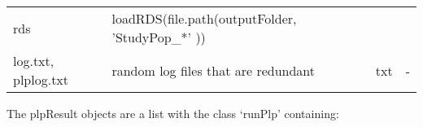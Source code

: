 \documentclass[
]{article}
\begin{document}
\begin{longtable}[]{@{}llll@{}}
\begin{minipage}[t]{0.08\columnwidth}
rds\strut
\end{minipage} & \begin{minipage}[t]{0.35\columnwidth}\raggedright
loadRDS(file.path(outputFolder, 'StudyPop\_*' ))\strut
\end{minipage}\tabularnewline
\begin{minipage}[t]{0.14\columnwidth}\raggedright
log.txt, plplog.txt\strut
\end{minipage} & \begin{minipage}[t]{0.31\columnwidth}\raggedright
random log files that are redundant\strut
\end{minipage} & \begin{minipage}[t]{0.08\columnwidth}\raggedright
txt\strut
\end{minipage} & \begin{minipage}[t]{0.35\columnwidth}\raggedright
-\strut
\end{minipage}\tabularnewline
\bottomrule
\end{longtable}

The plpResult objects are a list with the class `runPlp' containing:
\end{document}
